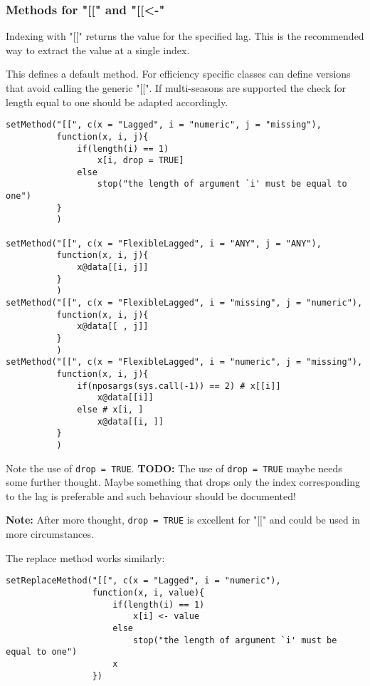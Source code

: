 \documentclass[11pt,a4paper]{article}
\begin{document}
\subsubsection{Methods for "[[" and "[[<-"}
\label{sec:org45bda62}

Indexing with "[[" returns the value for the specified lag. This is the recommended way to
extract the value at a single index.

This defines a default method. For efficiency specific classes can define versions that avoid
calling the generic "[[". If multi-seasons are supported the check for length equal to one
should be adapted accordingly.
\begin{verbatim}
setMethod("[[", c(x = "Lagged", i = "numeric", j = "missing"),
          function(x, i, j){
              if(length(i) == 1)
                  x[i, drop = TRUE]
              else
                  stop("the length of argument `i' must be equal to one")
          }
          )

setMethod("[[", c(x = "FlexibleLagged", i = "ANY", j = "ANY"),
          function(x, i, j){
              x@data[[i, j]]
          }
          )
setMethod("[[", c(x = "FlexibleLagged", i = "missing", j = "numeric"),
          function(x, i, j){
              x@data[[ , j]]
          }
          )
setMethod("[[", c(x = "FlexibleLagged", i = "numeric", j = "missing"),
          function(x, i, j){
              if(nposargs(sys.call(-1)) == 2) # x[[i]]
                  x@data[[i]]
              else # x[i, ]
                  x@data[[i, ]]
          }
          )
\end{verbatim}
Note the use of \texttt{drop = TRUE}.
\textbf{TODO:} The use of \texttt{drop = TRUE} maybe needs some further thought. Maybe something that drops
only the index corresponding to the lag is preferable and such behaviour should be documented!

\textbf{Note:} After more thought, \texttt{drop = TRUE} is excellent for "[[" and could be used in more
    circumstances. 

The replace method works similarly:
\begin{verbatim}
setReplaceMethod("[[", c(x = "Lagged", i = "numeric"),
                 function(x, i, value){
                     if(length(i) == 1)
                         x[i] <- value
                     else
                         stop("the length of argument `i' must be equal to one")
                     x
                 })
\end{verbatim}
\end{document}
